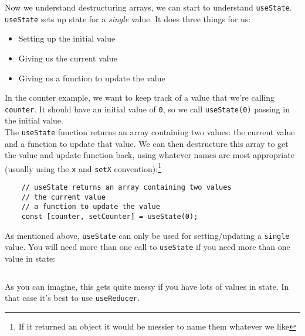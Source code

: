 Now we understand destructuring arrays, we can start to understand \texttt{useState}.
\\

\texttt{useState} sets up state for a \textit{single} value. It does three things for us:

\begin{itemize}
    \item Setting up the initial value
    \item Giving us the current value
    \item Giving us a function to update the value
\end{itemize}

In the counter example, we want to keep track of a value that we're calling \texttt{counter}. It should have an initial value of \texttt{0}, so we call \texttt{useState(0)} passing in the initial value.
\\

The \texttt{useState} function returns an array containing two values: the current value and a function to update that value. We can then destructure this array to get the value and update function back, using whatever names are most appropriate (usually using the \texttt{x} and \texttt{setX} convention):\footnote{If it returned an object it would be messier to name them whatever we like}

\begin{verbatim}
    // useState returns an array containing two values
    // the current value
    // a function to update the value
    const [counter, setCounter] = useState(0);
\end{verbatim}

As mentioned above, \texttt{useState} can only be used for setting/updating a \texttt{single} value. You will need more than one call to \texttt{useState} if you need more than one value in state:

\inputminted{js}{05-hooks/figures/03-multiple-useState.js}

As you can imagine, this gets quite messy if you have lots of values in state. In that case it's best to use \texttt{useReducer}.

\pagebreak

